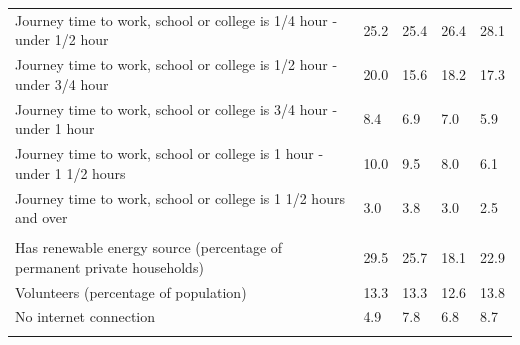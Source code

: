 \documentclass{article}
\begin{document}
\begin{table}[h]
\begin{tabular}{KTTTT}
Journey time to work, school or college is 1/4 hour - under 1/2 hour & 25.2& 25.4& 26.4& 28.1\\
Journey time to work, school or college is 1/2 hour - under 3/4 hour & 20.0& 15.6& 18.2& 17.3\\
Journey time to work, school or college is 3/4 hour - under 1 hour & 8.4& 6.9& 7.0& 5.9\\
Journey time to work, school or college is 1 hour - under 1 1/2 hours & 10.0&  9.5&  8.0&  6.1\\
Journey time to work, school or college is 1 1/2 hours and over & 3.0& 3.8& 3.0& 2.5\\
\hline
    \\ 
    \hline
Has renewable energy source (percentage of permanent private households) & 29.5& 25.7& 18.1& 22.9\\
    \hline
Volunteers (percentage of population) & 13.3& 13.3& 12.6& 13.8\\
    \hline
No internet connection& 4.9& 7.8& 6.8& 8.7\\
\hline
\end{tabular}
\end{table}
\end{document}
